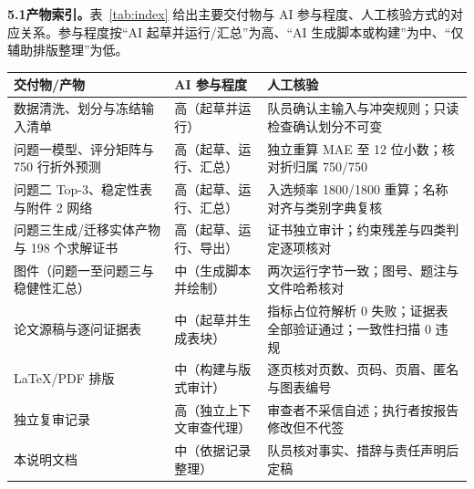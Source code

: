 \documentclass[11pt,a4paper]{article}
\renewcommand{\arraystretch}{1.12}
\begin{document}
\textbf{5.1\quad 产物索引。}\quad 表~\ref{tab:index} 给出主要交付物与 AI 参与程度、人工核验方式的对应关系。参与程度按“AI 起草并运行/汇总”为高、“AI 生成脚本或构建”为中、“仅辅助排版整理”为低。

\begin{center}
\begin{minipage}{\linewidth}
\centering
\renewcommand{\arraystretch}{1.04}
\footnotesize
\begin{tabular}{@{}p{4.6cm}p{4.2cm}p{6.4cm}@{}}
\toprule
交付物/产物 & AI 参与程度 & 人工核验 \\
\midrule
数据清洗、划分与冻结输入清单 & 高（起草并运行） & 队员确认主输入与冲突规则；只读检查确认划分不可变 \\
问题一模型、评分矩阵与 750 行折外预测 & 高（起草、运行、汇总） & 独立重算 MAE 至 12 位小数；核对折归属 750/750 \\
问题二 Top-3、稳定性表与附件 2 网络 & 高（起草、运行、汇总） & 入选频率 1800/1800 重算；名称对齐与类别字典复核 \\
问题三生成/迁移实体产物与 198 个求解证书 & 高（起草、运行、导出） & 证书独立审计；约束残差与四类判定逐项核对 \\
图件（问题一至问题三与稳健性汇总） & 中（生成脚本并绘制） & 两次运行字节一致；图号、题注与文件哈希核对 \\
论文源稿与逐问证据表 & 中（起草并生成表块） & 指标占位符解析 0 失败；证据表全部验证通过；一致性扫描 0 违规 \\
LaTeX/PDF 排版 & 中（构建与版式审计） & 逐页核对页数、页码、页眉、匿名与图表编号 \\
独立复审记录 & 高（独立上下文审查代理） & 审查者不采信自述；执行者按报告修改但不代签 \\
本说明文档 & 中（依据记录整理） & 队员核对事实、措辞与责任声明后定稿 \\
\bottomrule
\end{tabular}
\end{minipage}
\end{center}
\end{document}

